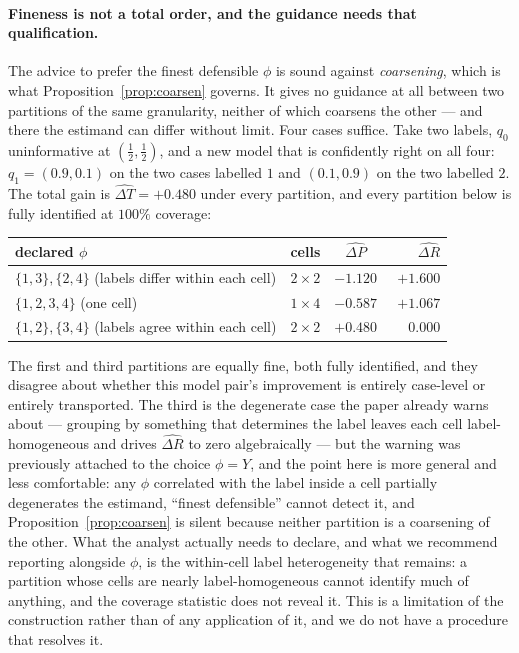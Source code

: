\paragraph{Fineness is not a total order, and the guidance needs that qualification.}
The advice to prefer the finest defensible $\phi$ is sound against \emph{coarsening},
which is what Proposition~\ref{prop:coarsen} governs. It gives no guidance at all between
two partitions of the same granularity, neither of which coarsens the other --- and there
the estimand can differ without limit. Four cases suffice. Take two labels, $q_0$
uninformative at $(\tfrac12,\tfrac12)$, and a new model that is confidently right on all
four: $q_1=(0.9,0.1)$ on the two cases labelled $1$ and $(0.1,0.9)$ on the two labelled
$2$. The total gain is $\widehat{\Delta T}=+0.480$ under every partition, and every
partition below is fully identified at $100\%$ coverage:
\begin{center}
\begin{tabular}{@{}lccr@{}}
\toprule
declared $\phi$ & cells & $\widehat{\Delta P}$ & $\widehat{\Delta R}$ \\
\midrule
$\{1,3\},\{2,4\}$ (labels differ within each cell) & $2\times2$ & $-1.120$ & $+1.600$ \\
$\{1,2,3,4\}$ (one cell)                           & $1\times4$ & $-0.587$ & $+1.067$ \\
$\{1,2\},\{3,4\}$ (labels agree within each cell)  & $2\times2$ & $+0.480$ & $\phantom{+}0.000$ \\
\bottomrule
\end{tabular}
\end{center}
The first and third partitions are equally fine, both fully identified, and they disagree
about whether this model pair's improvement is entirely case-level or entirely
transported. The third is the degenerate case the paper already warns about --- grouping
by something that determines the label leaves each cell label-homogeneous and drives
$\widehat{\Delta R}$ to zero algebraically --- but the warning was previously attached to
the choice $\phi=Y$, and the point here is more general and less comfortable: any $\phi$
correlated with the label inside a cell partially degenerates the estimand, ``finest
defensible'' cannot detect it, and Proposition~\ref{prop:coarsen} is silent because
neither partition is a coarsening of the other. What the analyst actually needs to
declare, and what we recommend reporting alongside $\phi$, is the within-cell label
heterogeneity that remains: a partition whose cells are nearly label-homogeneous cannot
identify much of anything, and the coverage statistic does not reveal it. This is a
limitation of the construction rather than of any application of it, and we do not have a
procedure that resolves it.

